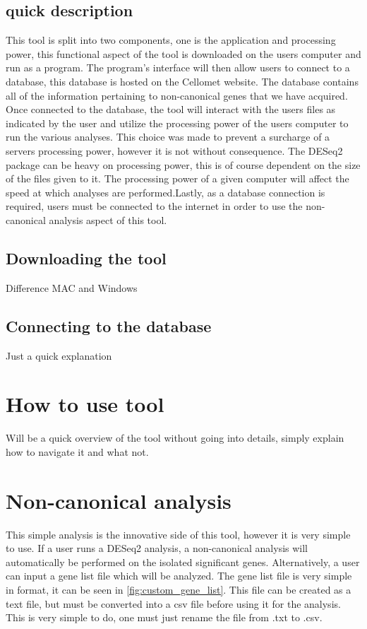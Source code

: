 \documentclass[11pt]{article}
\begin{document}
\subsection{quick description}
This tool is split into two components, one is the application and processing power, this functional aspect of the tool is downloaded on the users computer and run as a program. The program's interface will then allow users to connect to a database, this database is hosted on the Cellomet website. The database contains all of the information pertaining to non-canonical genes that we have acquired. Once connected to the database, the tool will interact with the users files as indicated by the user and utilize the processing power of the users computer to run the various analyses. This choice was made to prevent a surcharge of a servers processing power, however it is not without consequence.
The DESeq2 package can be heavy on processing power, this is of course dependent on the size of the files given to it. The processing power of a given computer will affect the speed at which analyses are performed.Lastly, as a database connection is required, users must be connected to the internet in order to use the non-canonical analysis aspect of this tool.

\subsection{Downloading the tool \label{download_tool}}
Difference MAC and Windows
\subsection{Connecting to the database \label{connect_DB}}
Just a quick explanation

\section{How to use tool}
Will be a quick overview of the tool without going into details, simply explain how to navigate it and what not.

\section{Non-canonical analysis \label{ncan_analysis}}
This simple analysis is the innovative side of this tool, however it is very simple to use. If a user runs a DESeq2 analysis, a non-canonical analysis will automatically be performed on the isolated significant genes. Alternatively, a user can input a gene list file which will be analyzed.
The gene list file is very simple in format, it can be seen in \autoref{fig:custom_gene_list}. This file can be created as a text file, but must be converted into a csv file before using it for the analysis. This is very simple to do, one must just rename the file from .txt to .csv.
\end{document}
